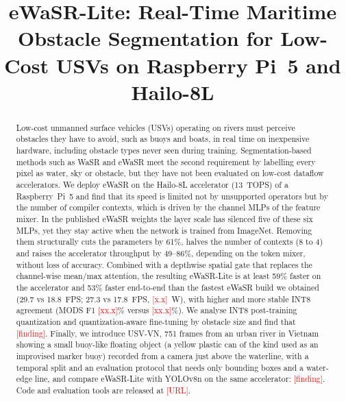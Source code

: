 \documentclass[conference]{IEEEtran}
\newcommand{\tbd}[1]{\textcolor{red}{[#1]}}
\begin{document}
\title{eWaSR-Lite: Real-Time Maritime Obstacle Segmentation for Low-Cost USVs on Raspberry Pi~5 and Hailo-8L}

\author{\IEEEauthorblockN{\tbd{Author 1}}
\IEEEauthorblockA{\tbd{Affiliation}\\
\tbd{email}}
\and
\IEEEauthorblockN{\tbd{Advisor}}
\IEEEauthorblockA{\tbd{Affiliation}\\
\tbd{email}}}

\maketitle

\begin{abstract}
Low-cost unmanned surface vehicles (USVs) operating on rivers must perceive obstacles they have to avoid, such as buoys and boats, in real time on inexpensive hardware, including obstacle types never seen during training. Segmentation-based methods such as WaSR and eWaSR meet the second requirement by labelling every pixel as water, sky or obstacle, but they have not been evaluated on low-cost dataflow accelerators. We deploy eWaSR on the Hailo-8L accelerator (13~TOPS) of a Raspberry~Pi~5 and find that its speed is limited not by unsupported operators but by the number of compiler contexts, which is driven by the channel MLPs of the feature mixer. In the published eWaSR weights the layer scale has silenced five of these six MLPs, yet they stay active when the network is trained from ImageNet. Removing them structurally cuts the parameters by 61\%, halves the number of contexts (8 to 4) and raises the accelerator throughput by 49--86\%, depending on the token mixer, without loss of accuracy. Combined with a depthwise spatial gate that replaces the channel-wise mean/max attention, the resulting eWaSR-Lite is at least 59\% faster on the accelerator and 53\% faster end-to-end than the fastest eWaSR build we obtained (29.7 vs 18.8~FPS; 27.3 vs 17.8~FPS, \tbd{x.x}~W), with higher and more stable INT8 agreement (MODS F1 \tbd{xx.x}\% versus \tbd{xx.x}\%). We analyse INT8 post-training quantization and quantization-aware fine-tuning by obstacle size and find that \tbd{finding}. Finally, we introduce USV-VN, 751 frames from an urban river in Vietnam showing a small buoy-like floating object (a yellow plastic can of the kind used as an improvised marker buoy) recorded from a camera just above the waterline, with a temporal split and an evaluation protocol that needs only bounding boxes and a water-edge line, and compare eWaSR-Lite with YOLOv8n on the same accelerator: \tbd{finding}. Code and evaluation tools are released at \tbd{URL}.
\end{abstract}
\end{document}
